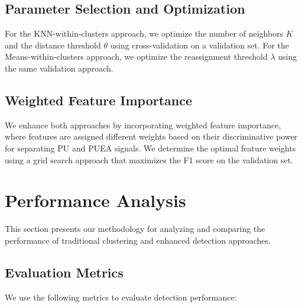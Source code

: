 \documentclass[conference]{IEEEtran}
\begin{document}
\subsection{Parameter Selection and Optimization}

For the KNN-within-clusters approach, we optimize the number of neighbors $K$ and the distance threshold $\theta$ using cross-validation on a validation set. For the Means-within-clusters approach, we optimize the reassignment threshold $\lambda$ using the same validation approach.

\subsection{Weighted Feature Importance}

We enhance both approaches by incorporating weighted feature importance, where features are assigned different weights based on their discriminative power for separating PU and PUEA signals. We determine the optimal feature weights using a grid search approach that maximizes the F1 score on the validation set.

\section{Performance Analysis}
\label{sec:performance_analysis}

This section presents our methodology for analyzing and comparing the performance of traditional clustering and enhanced detection approaches.

\subsection{Evaluation Metrics}

We use the following metrics to evaluate detection performance:
\end{document}
